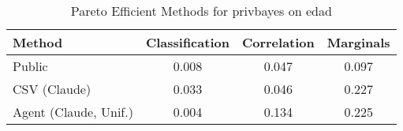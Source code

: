 \begin{table}[t!]
    \centering
    \caption{Pareto Efficient Methods for privbayes on edad}
    \label{tab:pareto_efficient_methods_privbayes_edad}
    \begin{tabular}{lccc}
    \toprule
    Method & Classification & Correlation & Marginals \\
    \midrule
    Public & \cellcolor{silver!30}0.008 & \cellcolor{silver!30}0.047 & \cellcolor{gold!30}0.097 \\
    CSV (Claude) & \cellcolor{bronze!30}0.033 & \cellcolor{gold!30}0.046 & \cellcolor{bronze!30}0.227 \\
    Agent (Claude, Unif.) & \cellcolor{gold!30}0.004 & \cellcolor{bronze!30}0.134 & \cellcolor{silver!30}0.225 \\
    \bottomrule
    \end{tabular}
\end{table}